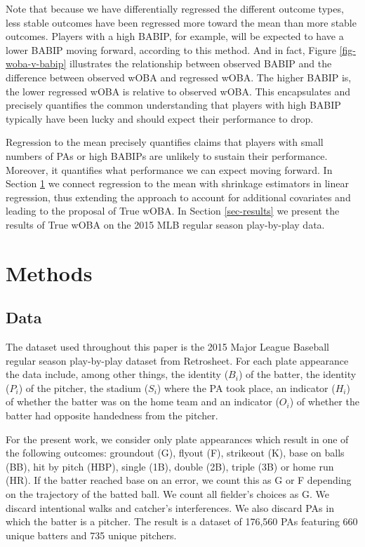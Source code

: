 \documentclass[11pt]{article}
\begin{document}
Note that because we have differentially regressed the different outcome types,
less stable outcomes have been regressed more toward the mean than more stable
outcomes. Players with a high BABIP, for example, will be expected to have a
lower BABIP moving forward, according to this method. And in fact, Figure
\ref{fig-woba-v-babip} illustrates the relationship between observed BABIP and
the difference between observed wOBA and regressed wOBA. The higher BABIP is,
the lower regressed wOBA is relative to observed wOBA. This encapsulates and
precisely quantifies the common understanding that players with high BABIP
typically have been lucky and should expect their performance to drop.

Regression to the mean precisely quantifies claims that players with small
numbers of PAs or high BABIPs are unlikely to sustain their performance.
Moreover, it quantifies what performance we can expect moving forward.
In Section \ref{sec-methods} we connect regression to the mean with shrinkage
estimators in linear regression, thus extending the approach to account for
additional covariates and leading to the proposal of True wOBA. In Section
\ref{sec-results} we present the results of True wOBA on the 2015 MLB regular
season play-by-play data.


\section{Methods}
\label{sec-methods}

\subsection{Data}
\label{sub-data}

The dataset used throughout this paper is the 2015 Major League Baseball
regular season play-by-play dataset from Retrosheet. For each plate appearance
the data include, among other things, the identity ($B_i$) of the batter, the
identity ($P_i$) of the pitcher, the stadium ($S_i$) where the PA took place,
an indicator ($H_i$) of whether the batter was on the home team and an indicator
($O_i$) of whether the batter had opposite handedness from the pitcher.

For the present work, we consider only plate appearances which result in one of
the following outcomes: groundout (G), flyout (F), strikeout (K), base on balls
(BB), hit by pitch (HBP), single (1B), double (2B), triple (3B) or home run
(HR). If the batter reached base on an error, we count this as G or F depending
on the trajectory of the batted ball. We count all fielder's choices as G. We
discard intentional walks and catcher's interferences. We also discard PAs in
which the batter is a pitcher. The result is a dataset of 176,560 PAs featuring
660 unique batters and 735 unique pitchers.
\end{document}
